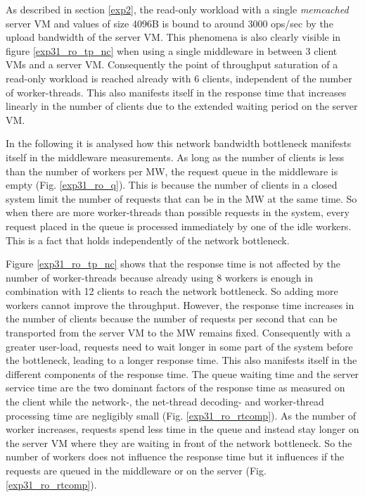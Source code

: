 \documentclass[report.tex]{subfiles}
\begin{document}
As described in section \ref{exp2}, the read-only workload with a single \emph{memcached} server VM and values of size 4096B is bound to around 3000 ops/sec by the upload bandwidth of the server VM. This phenomena is also clearly visible in figure \ref{exp31_ro_tp_nc} when using a single middleware in between 3 client VMs and a server VM. Consequently the point of throughput saturation of a read-only workload is reached already with 6 clients, independent of the number of worker-threads. This also manifests itself in the response time that increases linearly in the number of clients due to the extended waiting period on the server VM.

In the following it is analysed how this network bandwidth bottleneck manifests itself in the middleware measurements. 
As long as the number of clients is less than the number of workers per MW, the request queue in the middleware is empty (Fig. \ref{exp31_ro_q}). This is because the number of clients in a closed system limit the number of requests that can be in the MW at the same time. 
So when there are more worker-threads than possible requests in the system, every request placed in the queue is processed immediately by one of the idle workers. This is a fact that holds independently of the network bottleneck. 

Figure \ref{exp31_ro_tp_nc} shows that the response time is not affected by the number of worker-threads because already using 8 workers is enough in combination with 12 clients to reach the network bottleneck. So adding more workers cannot improve the throughput. 
However, the response time increases in the number of clients because the number of requests per second that can be transported from the server VM to the MW remains fixed. Consequently with a greater user-load, requests need to wait longer in some part of the system before the bottleneck, leading to a longer response time.
This also manifests itself in the different components of the response time.
The queue waiting time and the server service time are the two dominant factors of the response time as measured on the client while the network-, the net-thread decoding- and worker-thread processing time are negligibly small  (Fig. \ref{exp31_ro_rtcomp}). As the number of worker increases, requests spend less time in the queue and instead stay longer on the server VM where they are waiting in front of the network bottleneck. 
So the number of workers does not influence the response time but it influences if the requests are queued in the middleware or on the server (Fig. \ref{exp31_ro_rtcomp}).
\end{document}
